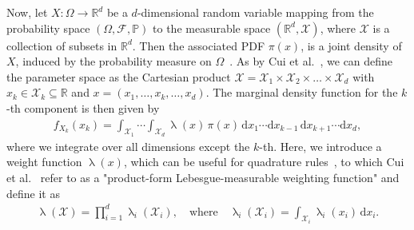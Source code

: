 Now, let $X: \Omega \longrightarrow \mathbb{R}^d$ be a $d$-dimensional random variable mapping from the probability space $(\Omega, \mathcal{F}, \mathbb{P})$ to the measurable space $(\mathbb{R}^d, \mathcal{X})$, where $\mathcal{X}$ is a collection of subsets in $\mathbb{R}^d$.
Then the associated PDF $\pi(x)$, is a joint density of $X$, induced by the probability measure on $\Omega$~\cite{VesaInvLect, kopp2004measintprob}.
As by Cui et al.~\cite{cui2022deep}, we can define the parameter space as the Cartesian product $\mathcal{X} = \mathcal{X}_1 \times \mathcal{X}_2 \times \dots \times \mathcal{X}_d$ with $ x_k \in \mathcal{X}_k \subseteq \mathbb{R}$ and $x = ( x_1,\dots ,x_k,\dots,x_d )$.
The marginal density function for the $k$-th component is then given by
\begin{align}
	f_{X_k}(x_k) = \int_{\mathcal{X}_1} \cdots \int_{\mathcal{X}_d} \uplambda(x) \, \pi(x) \, \mathrm{d}x_1 \cdots \mathrm{d}x_{k-1} \, \mathrm{d}x_{k+1} \cdots \mathrm{d}x_d,
\end{align}
where we integrate over all dimensions except the $k$-th.
Here, we introduce a weight function $\uplambda(x)$, which can be useful for quadrature rules~\cite{davis2007methods}, to which 
Cui et al.~\cite{cui2022deep} refer to as a "product-form Lebesgue-measurable weighting function" and define it as
\begin{align*}
	\uplambda(\mathcal{X}) = \prod_{i = 1}^{d} \uplambda_i(\mathcal{X}_i), \quad \text{where} \quad \uplambda_i(\mathcal{X}_i) = \int_{\mathcal{X}_i} \uplambda_i(x_i) \, \mathrm{d}x_i. \label{eq:lebesgueWeight}
\end{align*}

